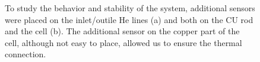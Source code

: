 \begin{refsection}
        \begin{figure}[ht]   
            \centering
            \hfill
            \caption[CEX 2023: additional \lakeshore sensors]{To study the behavior and stability of the system, additional \lakeshore sensors were placed on the inlet/outile He lines (a) and both on the CU rod and the cell (b). The additional sensor on the copper part of the cell, although not easy to place, allowed us to ensure the thermal connection.}
            \label{fig:CEX:2023:sensors}
        \end{figure}


\end{refsection}

